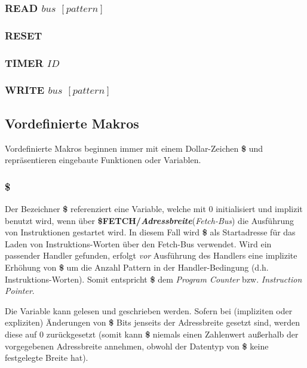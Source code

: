 \documentclass{scrartcl}
\begin{document}
\subsubsection{READ $bus$ $[pattern]$}

\subsubsection{RESET}

\subsubsection{TIMER $ID$}

\subsubsection{WRITE $bus$ $[pattern]$}

\subsection{Vordefinierte Makros}
\label{subsec:predefinedmacrosref}

\noindent Vordefinierte Makros beginnen immer mit einem Dollar-Zeichen \textbf{\$} und repräsentieren eingebaute Funktionen oder Variablen.

\subsubsection{\$}

\noindent Der Bezeichner \textbf{\$} referenziert eine Variable, welche mit 0 initialisiert und implizit benutzt wird, wenn über \textbf{\$FETCH/\textit{Adressbreite}}(\textit{Fetch-Bus}) die Ausführung von Instruktionen gestartet wird. In diesem Fall wird \textbf{\$} als Startadresse für das Laden von Instruktions-Worten über den Fetch-Bus verwendet. Wird ein passender Handler gefunden, erfolgt \textit{vor} Ausführung des Handlers eine implizite Erhöhung von \textbf{\$} um die Anzahl Pattern in der Handler-Bedingung (d.h. Instruktions-Worten). Somit entspricht \textbf{\$} dem \textit{Program Counter} bzw. \textit{Instruction Pointer}.

\vspace{10pt}
\noindent Die Variable kann gelesen und geschrieben werden. Sofern bei (impliziten oder expliziten) Änderungen von \textbf{\$} Bits jenseits der Adressbreite gesetzt sind, werden diese auf 0 zurückgesetzt (somit kann \textbf{\$} niemals einen Zahlenwert außerhalb der vorgegebenen Adressbreite annehmen, obwohl der Datentyp von \textbf{\$} keine festgelegte Breite hat).
\end{document}

